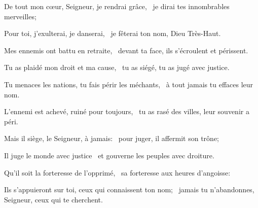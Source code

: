 \item De tout mon cœur, Seigneur, je rendrai grâce,~\psstar{} je dirai tes innombrables merveilles;
\item Pour toi, j'exulterai, je danserai,~\psstar{} je fêterai ton nom, Dieu Très-Haut.
\item Mes ennemis ont battu en retraite,~\psstar{} devant ta face, ils s'écroulent et périssent.
\item Tu as plaidé mon droit et ma cause,~\psstar{} tu as siégé, tu as jugé avec justice.
\item Tu menaces les nations, tu fais périr les méchants,~\psstar{} à tout jamais tu effaces leur nom.
\item L'ennemi est achevé, ruiné pour toujours,~\psstar{} tu as rasé des villes, leur souvenir a péri.
\item Mais il siège, le Seigneur, à jamais:~\psstar{} pour juger, il affermit son trône;
\item Il juge le monde avec justice~\psstar{} et gouverne les peuples avec droiture.
\item Qu'il soit la forteresse de l'opprimé,~\psstar{} sa forteresse aux heures d'angoisse:
\item Ils s'appuieront sur toi, ceux qui connaissent ton nom;~\psstar{} jamais tu n'abandonnes, Seigneur, ceux qui te cherchent.